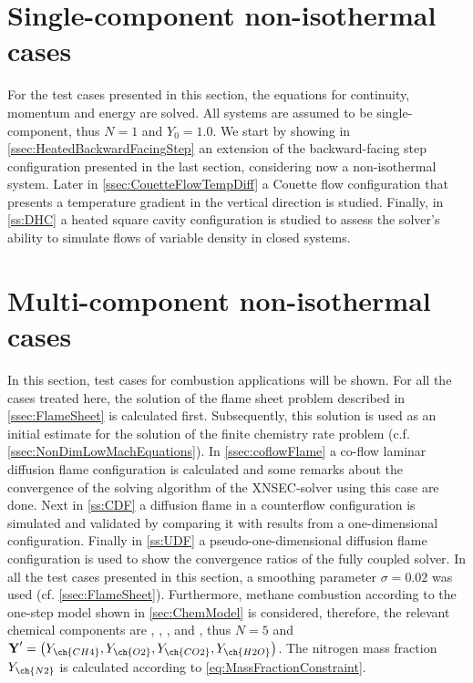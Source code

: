\section{Single-component non-isothermal cases} \label{sec:SinCompNonIsothermCase}
For the test cases presented in this section, the equations for continuity, momentum and energy are solved. All systems are assumed to be single-component, thus $N = 1$ and $Y_0 = 1.0$. We start by showing in \cref{ssec:HeatedBackwardFacingStep} an extension of the backward-facing step configuration presented in the last section, considering now a non-isothermal system. Later in \cref{ssec:CouetteFlowTempDiff} a Couette flow configuration that presents a temperature gradient in the vertical direction is studied. Finally, in \cref{ss:DHC} a heated square cavity configuration is studied to assess the solver's ability to simulate flows of variable density in closed systems.














\section{Multi-component non-isothermal cases}\label{sec:MultCompNonIsothermCase}
In this section, test cases for combustion applications will be shown. For all the cases treated here, the solution of the flame sheet problem described in \cref{ssec:FlameSheet} is calculated first. Subsequently, this solution is used as an initial estimate for the solution of the finite chemistry rate problem (c.f. \cref{ssec:NonDimLowMachEquations}). In \cref{ssec:coflowFlame} a co-flow laminar diffusion flame configuration is calculated and some remarks about the convergence of the solving algorithm of the XNSEC-solver using this case are done. Next in \cref{ss:CDF} a diffusion flame in a counterflow configuration is simulated and validated by comparing it with results from a one-dimensional configuration. Finally in \cref{ss:UDF} a pseudo-one-dimensional diffusion flame configuration is used to show the convergence ratios of the fully coupled solver. In all the test cases presented in this section, a smoothing parameter $\sigma = 0.02$ was used (cf. \cref{ssec:FlameSheet}). Furthermore, methane combustion according to the one-step model shown in \cref{sec:ChemModel} is considered, therefore, the relevant chemical components are , , ,  and , thus $N = 5$ and $\vec{Y}' = \left(Y_{\ch{CH4}},Y_{\ch{O2}},Y_{\ch{CO2}},Y_{\ch{H2O}}\right)$. The nitrogen mass fraction $Y_{\ch{N2}}$ is calculated according to \cref{eq:MassFractionConstraint}.







\FloatBarrier
